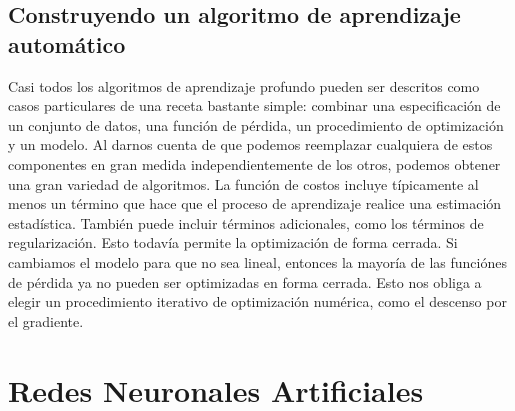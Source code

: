 \documentclass[a4paper,11pt,spanish]{book}
\begin{document}
    \subsection{Construyendo un algoritmo de aprendizaje automático}
      Casi todos los algoritmos de aprendizaje profundo pueden ser descritos como casos particulares de una receta bastante simple:
      combinar una especificación de un conjunto de datos, una función de pérdida, un procedimiento de optimización y un modelo.
      Al darnos cuenta de que podemos reemplazar cualquiera de estos componentes en gran medida independientemente de los otros, podemos obtener una gran variedad de algoritmos.
      La función de costos incluye típicamente al menos un término que hace que el proceso de aprendizaje realice una estimación estadística. También puede incluir términos adicionales,
      como los términos de regularización. Esto todavía permite la optimización de forma cerrada.
      Si cambiamos el modelo para que no sea lineal, entonces la mayoría de las funciónes de pérdida ya no pueden ser optimizadas en forma cerrada.
      Esto nos obliga a elegir un procedimiento iterativo de optimización numérica, como el descenso por el gradiente.

    \section{Redes Neuronales Artificiales}
\end{document}
